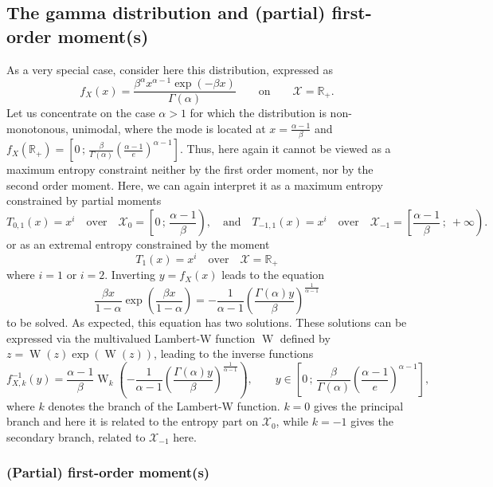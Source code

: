 \documentclass[english,onecolumn]{elsarticle}
\def\Rset{\mathbb{R}}
\def\X{\mathcal{X}}
\def\W{\operatorname{W}}
\begin{document}

\subsection{The gamma distribution and (partial) first-order moment(s)}
\label{subsec:GammaFirstOrder}

As a very special case, consider here this distribution, expressed as
%
\[
f_X(x) = \frac{\beta^\alpha x^{\alpha-1} \exp(-\beta x)}{\Gamma(\alpha)} \qquad
\mbox{on} \qquad \X = \Rset_+.
\]
%
Let  us concentrate  on the  case $\alpha  > 1$  for which  the  distribution is
non-monotonous,   unimodal,    where   the   mode    is   located   at    $x   =
\frac{\alpha-1}{\beta}$    and   $f_X(\Rset_+)    =   \left[    0   \,    ;   \,
  \frac{\beta}{\Gamma(\alpha)}   \left(   \frac{\alpha-1}{e}  \right)^{\alpha-1}
\right]$.  Thus, here again it cannot  be viewed as a maximum entropy constraint
neither by the first order moment, nor  by the second order moment. Here, we can
again interpret it as a maximum entropy constrained by partial moments
%
\[
T_{0,1}(x) = x^i \quad \mbox{over} \quad \X_0 = \left[ 0 \, ; \,
\frac{\alpha-1}{\beta} \right), \quad \mbox{and} \quad T_{-1,1}(x) = x^i \quad
\mbox{over} \quad \X_{-1} = \left[\frac{\alpha-1}{\beta} \, ; \: + \infty
\right).
\]
%
or as an extremal entropy constrained by the moment
%
\[
T_1(x) = x^i \quad \mbox{over} \quad \X = \Rset_+
\]
%
where $i = 1$ or $i = 2$.
%
Inverting $y = f_X(x)$ leads to the equation
%
\[
\frac{\beta x}{1-\alpha} \exp\left(\frac{\beta x}{1-\alpha}\right) = -
\frac{1}{\alpha-1} \left( \frac{\Gamma(\alpha) y}{\beta}
\right)^{\frac{1}{\alpha-1}}
\]
%
to be solved. As expected, this  equation has two solutions. These solutions can
be expressed via  the multivalued Lambert-W function $\W$ defined  by $z = \W(z)
\exp(\W(z))$, leading to the inverse functions
%
\[
f_{X,k}^{-1}(y) = \frac{\alpha-1}{\beta} \W_k \left( -
\frac{1}{\alpha-1} \left( \frac{\Gamma(\alpha) y}{\beta}
\right)^{\frac{1}{\alpha-1}} \right), \qquad y \in \left[ 0 \, ; \,
\frac{\beta}{\Gamma(\alpha)} \left( \frac{\alpha-1}{e}\right)^{\alpha-1} \right],
\]
%
where  $k$ denotes the  branch of  the Lambert-W  function.  $k  = 0$  gives the
principal branch and here it is related  to the entropy part on $\X_0$, while $k
= -1$ gives the secondary branch, related to $\X_{-1}$ here. 


\subsubsection{(Partial) first-order moment(s)}
\end{document}
